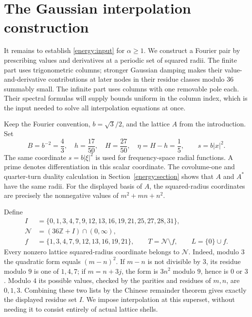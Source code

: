 \documentclass[11pt]{article}
\theoremstyle{remark}\newtheorem{remark}[theorem]{Remark}
\begin{document}
\section{The Gaussian interpolation construction}\label{sec:construction}

It remains to establish \eqref{energy:input} for $\alpha\ge1$.
We construct a Fourier pair by prescribing values and derivatives at a
periodic set of squared radii. The finite part uses trigonometric columns;
stronger Gaussian damping makes their value-and-derivative contributions
at later nodes in their residue classes modulo $36$ summably small.
The infinite part uses columns with one removable pole each. Their spectral formulas
will supply bounds uniform in the column index, which is the input needed
to solve all interpolation equations at once.

Keep the Fourier convention, $b=\sqrt3/2$, and the lattice $A$ from
the introduction. Set
\[
 B=b^{-2}=\frac43,\quad
 h=\frac{17}{50},\quad H=\frac{27}{50},\quad
 \eta=H-h=\frac15,\qquad s=b|x|^2.
\]
The same coordinate $s=b|\xi|^2$ is used for frequency-space radial
functions. A prime denotes differentiation in this scalar coordinate.
The covolume-one and quarter-turn duality calculation in
Section~\ref{energy:section} shows that $A$ and $A^*$ have the same radii.
For the displayed basis of $A$, the squared-radius coordinates are
precisely the nonnegative values of $m^2+mn+n^2$.

Define
\begin{align*}
 I&=\{0,1,3,4,7,9,12,13,16,19,21,25,27,28,31\},\\
 \mathcal N&=(36\mathbb Z+I)\cap(0,\infty),\\
 f&=\{1,3,4,7,9,12,13,16,19,21\},\qquad
 T=\mathcal N\setminus f,\qquad L=\{0\}\cup f.
\end{align*}
Every nonzero lattice squared-radius coordinate belongs to $\mathcal N$.
Indeed, modulo $3$ the quadratic form equals $(m-n)^2$. If $m-n$ is
not divisible by $3$, its residue modulo $9$ is one of $1,4,7$; if
$m=n+3j$, the form is $3n^2$ modulo $9$, hence is $0$ or $3$.
Modulo $4$ its possible values, checked by the parities and residues of
$m,n$, are $0,1,3$. Combining these two lists by the Chinese remainder
theorem gives exactly the displayed residue set $I$. We impose
interpolation at this superset, without needing it to consist entirely
of actual lattice shells.
\end{document}
